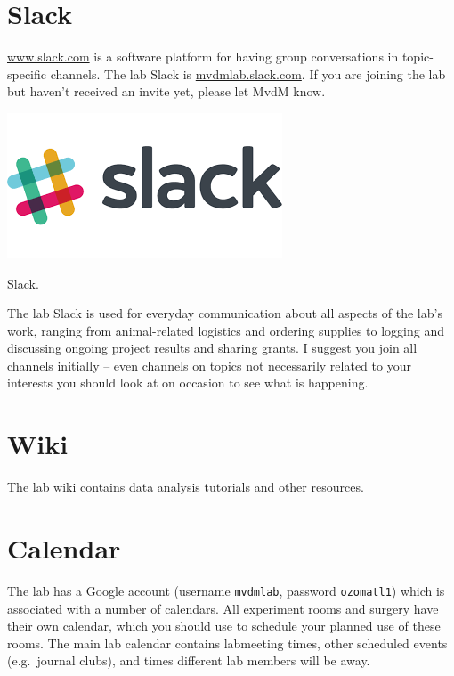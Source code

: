 \documentclass{tufte-book}
\newcommand{\doccls}[1]{\texttt{#1}}%
\begin{document}
\section{Slack}

\href{Slack}{www.slack.com} is a software platform for having group
conversations in topic-specific channels. The lab Slack is
\url{mvdmlab.slack.com}. If you are joining the lab but haven't
received an invite yet, please let MvdM know.

\begin{marginfigure}%
  \includegraphics[width=\linewidth]{images/slack.png}
  \caption{Slack.}
  \label{fig:slack}
\end{marginfigure}

The lab Slack is used for everyday communication about all aspects of
the lab's work, ranging from animal-related logistics and ordering
supplies to logging and discussing ongoing project results and sharing
grants. I suggest you join all channels initially -- even channels on
topics not necessarily related to your interests you should look at on
occasion to see what is happening.

\section{Wiki}

The lab \href{http://discovery.dartmouth.edu/~mvdm/wiki/}{wiki}
contains data analysis tutorials and other resources.

\section{Calendar}

The lab has a Google account (username \doccls{mvdmlab}, password
\doccls{ozomatl1}) which is associated with a number of calendars. All
experiment rooms and surgery have their own calendar, which you should
use to schedule your planned use of these rooms. The main lab calendar
contains labmeeting times, other scheduled events (e.g.\ journal
clubs), and times different lab members will be away.
\end{document}
